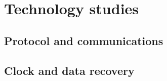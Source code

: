 \chapter{Technology studies}

\section{Protocol and communications}

\section{Clock and data recovery}


